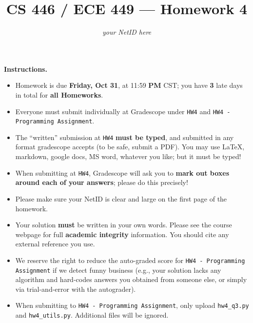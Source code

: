 \documentclass{article}
\title{CS 446 / ECE 449 --- Homework 4}
\author{\emph{your NetID here}}
\date{}
\theoremstyle{definition}
\theoremstyle{remark}
\def\hw{HW4}
\def\hwcode{HW4 - Programming Assignment}
\begin{document}
        \maketitle

        \noindent\textbf{Instructions.}
        \begin{itemize}
          \item
            Homework is due \textbf{Friday, Oct 31}, at 11:59 \textbf{PM} CST; you have \textbf{3} late days in total for \textbf{all Homeworks}.
        
          \item
            Everyone must submit individually at Gradescope under \texttt{\hw} and \texttt{\hwcode}.
        
          \item
            The ``written'' submission at \texttt{\hw} \textbf{must be typed}, and submitted in any format gradescope accepts (to be safe, submit a PDF).  You may use \LaTeX, markdown, google docs, MS word, whatever you like; but it must be typed!
        
          \item
            When submitting at \texttt{\hw}, Gradescope will ask you to \textbf{mark out boxes around each of your answers}; please do this precisely!
        
          \item
            Please make sure your NetID is clear and large on the first page of the homework.
        
          \item
            Your solution \textbf{must} be written in your own words.
            Please see the course webpage for full \textbf{academic integrity} information.
            You should cite any external reference you use.
        
          \item
            We reserve the right to reduce the auto-graded score for
            \texttt{\hwcode} if we detect funny business (e.g., your solution
            lacks any algorithm and hard-codes answers you obtained from
            someone else, or simply via trial-and-error with the autograder).
            
          \item
           When submitting to \texttt{\hwcode}, only upload \texttt{hw4\_q3.py} and \texttt{hw4\_utils.py}. Additional files will be ignored.
           
        \end{itemize}
        
\end{document}
